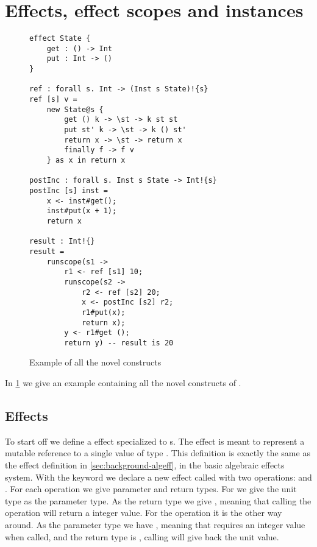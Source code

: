 \section{Effects, effect scopes and instances}
\label{sec:lang-basics}

\begin{figure}
\caption{Example of all the novel constructs}
\begin{verbatim}
effect State {
	get : () -> Int
	put : Int -> ()
}

ref : forall s. Int -> (Inst s State)!{s}
ref [s] v =
	new State@s {
		get () k -> \st -> k st st
		put st' k -> \st -> k () st'
		return x -> \st -> return x
		finally f -> f v
	} as x in return x

postInc : forall s. Inst s State -> Int!{s}
postInc [s] inst =
	x <- inst#get();
	inst#put(x + 1);
	return x

result : Int!{}
result =
	runscope(s1 ->
		r1 <- ref [s1] 10;
		runscope(s2 ->
			r2 <- ref [s2] 20;
			x <- postInc [s2] r2;
			r1#put(x);
			return x);
		y <- r1#get ();
		return y) -- result is 20
\end{verbatim}
\label{fig:example1}
\end{figure}

In \cref{fig:example1} we give an example containing all the novel constructs of \lang{}.

\subsection{Effects}

To start off we define a  effect specialized to s.
The  effect is meant to represent a mutable reference to a single value of type .
This definition is exactly the same as the  effect definition in \cref{sec:background-algeff}, in the basic algebraic effects system.
With the  keyword we declare a new effect called  with two operations:  and .
For each operation we give parameter and return types. For  we give the unit type \ident{()} as the parameter type.
As the return type we give , meaning that calling the  operation will return a integer value.
For the  operation it is the other way around.
As the parameter type we have , meaning that  requires an integer value when called, and the return type is \ident{()}, calling  will give back the unit value.

